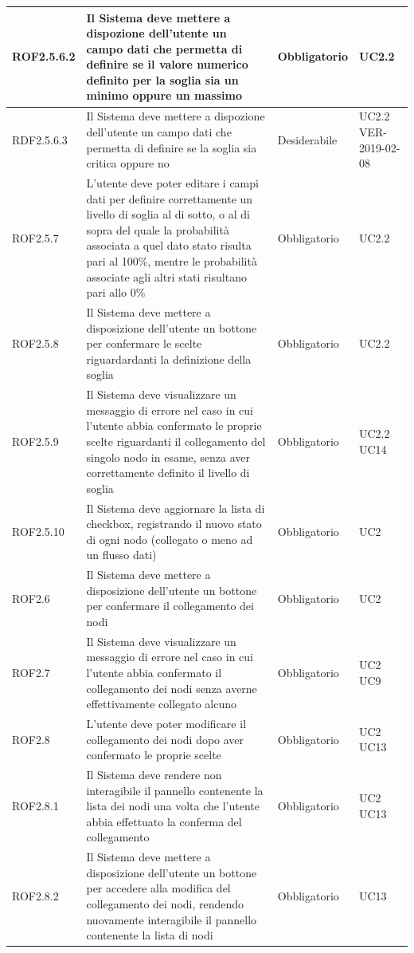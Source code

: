 \begin{center}
\begin{longtable}[c]{|m{}|m{}|m{}|m{}|}
\hline
\rowcolor{grigio}ROF2.5.6.2 & Il Sistema deve mettere a dispozione dell'utente un campo dati che permetta di definire se il valore numerico definito per la soglia sia un minimo oppure un massimo & Obbligatorio & UC2.2\\
\hline
RDF2.5.6.3 & Il Sistema deve mettere a dispozione dell'utente un campo dati che permetta di definire se la soglia sia critica oppure no & Desiderabile & UC2.2 VER-2019-02-08\\
\hline
\rowcolor{grigio}ROF2.5.7 & L'utente deve poter editare i campi dati per definire correttamente un livello di soglia al di sotto, o al di sopra del quale la probabilità associata a quel dato stato risulta pari al 100\%, mentre le probabilità associate agli altri stati risultano pari allo 0\% & Obbligatorio & UC2.2\\
\hline
ROF2.5.8 & Il Sistema deve mettere a disposizione dell'utente un bottone per confermare le scelte riguardardanti la definizione della soglia & Obbligatorio & UC2.2\\
\hline
\rowcolor{grigio}ROF2.5.9 & Il Sistema deve visualizzare un messaggio di errore nel caso in cui l'utente abbia confermato le proprie scelte riguardanti il collegamento del singolo nodo in esame, senza aver correttamente definito il livello di soglia & Obbligatorio & UC2.2 UC14\\
\hline
ROF2.5.10 & Il Sistema deve aggiornare la lista di checkbox, registrando il nuovo stato di ogni nodo (collegato o meno ad un flusso dati) & Obbligatorio & UC2\\
\hline
\rowcolor{grigio}ROF2.6 & Il Sistema deve mettere a disposizione dell'utente un bottone per confermare il collegamento dei nodi & Obbligatorio & UC2\\
\hline
ROF2.7 & Il Sistema deve visualizzare un messaggio di errore nel caso in cui l'utente abbia confermato il collegamento dei nodi senza averne effettivamente collegato alcuno & Obbligatorio & UC2 UC9\\
\hline
\rowcolor{grigio}ROF2.8 & L'utente deve poter modificare il collegamento dei nodi dopo aver confermato le proprie scelte & Obbligatorio & UC2 UC13\\
\hline
ROF2.8.1 & Il Sistema deve rendere non interagibile il pannello contenente la lista dei nodi una volta che l'utente abbia effettuato la conferma del collegamento & Obbligatorio & UC2 UC13\\
\hline
\rowcolor{grigio}ROF2.8.2 & Il Sistema deve mettere a disposizione dell'utente un bottone per accedere alla modifica del collegamento dei nodi, rendendo nuovamente interagibile il pannello contenente la lista di nodi & Obbligatorio & UC13\\

\end{longtable}
\end{center}
